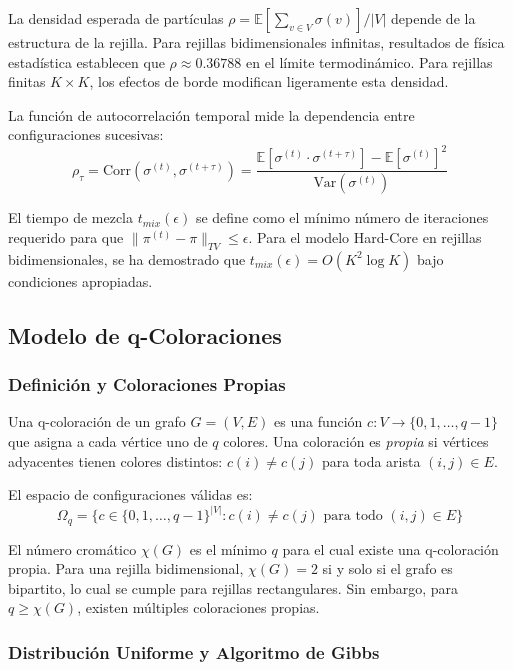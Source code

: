 La densidad esperada de partículas $\rho = \mathbb{E}[\sum_{v \in V} \sigma(v)] / |V|$ depende de la estructura de la rejilla. Para rejillas bidimensionales infinitas, resultados de física estadística establecen que $\rho \approx 0.36788$ en el límite termodinámico. Para rejillas finitas $K \times K$, los efectos de borde modifican ligeramente esta densidad.

La función de autocorrelación temporal mide la dependencia entre configuraciones sucesivas:
\begin{equation}
\rho_{\tau} = \text{Corr}(\sigma^{(t)}, \sigma^{(t+\tau)}) = \frac{\mathbb{E}[\sigma^{(t)} \cdot \sigma^{(t+\tau)}] - \mathbb{E}[\sigma^{(t)}]^2}{\text{Var}(\sigma^{(t)})}
\end{equation}

El tiempo de mezcla $t_{mix}(\epsilon)$ se define como el mínimo número de iteraciones requerido para que $\|\pi^{(t)} - \pi\|_{TV} \leq \epsilon$. Para el modelo Hard-Core en rejillas bidimensionales, se ha demostrado que $t_{mix}(\epsilon) = O(K^2 \log K)$ bajo condiciones apropiadas.

\subsection{Modelo de q-Coloraciones}

\subsubsection{Definición y Coloraciones Propias}

Una q-coloración de un grafo $G = (V, E)$ es una función $c: V \to \{0, 1, \ldots, q-1\}$ que asigna a cada vértice uno de $q$ colores. Una coloración es \textit{propia} si vértices adyacentes tienen colores distintos: $c(i) \neq c(j)$ para toda arista $(i,j) \in E$.

El espacio de configuraciones válidas es:
\begin{equation}
\Omega_q = \{c \in \{0,1,\ldots,q-1\}^{|V|} : c(i) \neq c(j) \text{ para todo } (i,j) \in E\}
\end{equation}

El número cromático $\chi(G)$ es el mínimo $q$ para el cual existe una q-coloración propia. Para una rejilla bidimensional, $\chi(G) = 2$ si y solo si el grafo es bipartito, lo cual se cumple para rejillas rectangulares. Sin embargo, para $q \geq \chi(G)$, existen múltiples coloraciones propias.

\subsubsection{Distribución Uniforme y Algoritmo de Gibbs}

